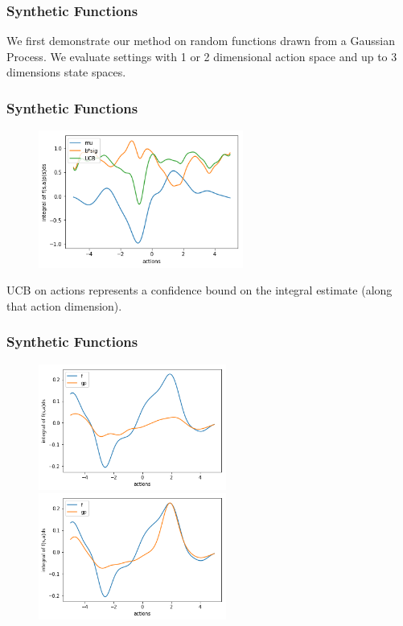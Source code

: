 \documentclass[11pt]{beamer}
\begin{document}
\begin{frame}
\frametitle{Synthetic Functions}
We first demonstrate our method on random functions drawn from a Gaussian Process.
\newline \newline
We evaluate settings with 1 or 2 dimensional action space and up to 3 dimensions state spaces.
\end{frame}

\begin{frame}
\frametitle{Synthetic Functions}
\begin{figure}
	\includegraphics[width=0.6\textwidth]{3}
\end{figure}
UCB on actions represents a confidence bound on the integral estimate (along that action dimension).
\end{frame}

\begin{frame}
\frametitle{Synthetic Functions}
\begin{figure}
	\includegraphics[width=0.55\textwidth]{2}

	\includegraphics[width=0.55\textwidth]{1}
\end{figure}
\end{frame}
\end{document}
